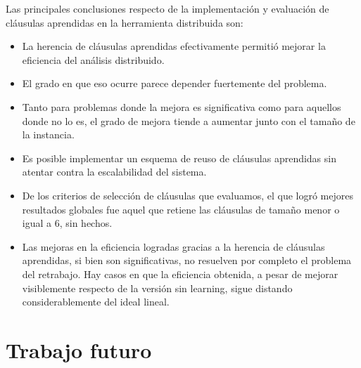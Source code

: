 Las principales conclusiones respecto de la implementación y evaluación de cláusulas aprendidas en la herramienta distribuida son:

\begin{itemize}

\item La herencia de cláusulas aprendidas efectivamente permitió mejorar la eficiencia del análisis distribuido.

\item El grado en que eso ocurre parece depender fuertemente del problema.

\item Tanto para problemas donde la mejora es significativa como para aquellos donde no lo es, el grado de mejora tiende a aumentar junto con el tamaño de la instancia.

\item Es posible implementar un esquema de reuso de cláusulas aprendidas sin atentar contra la escalabilidad del sistema.

\item De los criterios de selección de cláusulas que evaluamos, el que logró mejores resultados globales fue aquel que retiene las cláusulas de tamaño menor o igual a 6, sin hechos.

\item Las mejoras en la eficiencia logradas gracias a la herencia de cláusulas aprendidas, si bien son significativas, no resuelven por completo el problema del retrabajo. Hay casos en que la eficiencia obtenida, a pesar de mejorar visiblemente respecto de la versión sin learning, sigue distando considerablemente del ideal lineal.

\end{itemize}







%
%
%
%
%


\section{Trabajo futuro}

